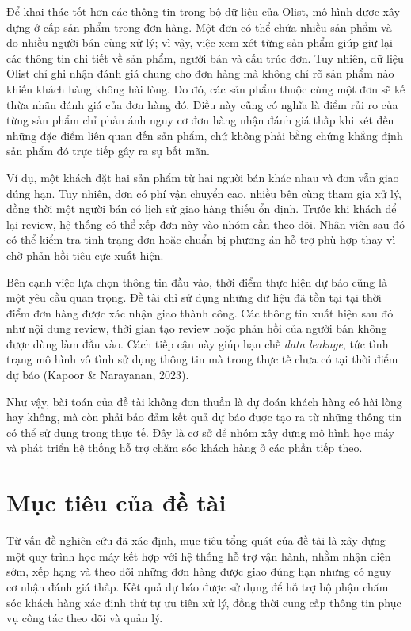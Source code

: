\documentclass[12pt,a4paper]{report}
\begin{document}
Để khai thác tốt hơn các thông tin trong bộ dữ liệu của Olist, mô hình được xây dựng ở cấp sản phẩm trong đơn hàng. Một đơn có thể chứa nhiều sản phẩm và do nhiều người bán cùng xử lý; vì vậy, việc xem xét từng sản phẩm giúp giữ lại các thông tin chi tiết về sản phẩm, người bán và cấu trúc đơn. Tuy nhiên, dữ liệu Olist chỉ ghi nhận đánh giá chung cho đơn hàng mà không chỉ rõ sản phẩm nào khiến khách hàng không hài lòng. Do đó, các sản phẩm thuộc cùng một đơn sẽ kế thừa nhãn đánh giá của đơn hàng đó. Điều này cũng có nghĩa là điểm rủi ro của từng sản phẩm chỉ phản ánh nguy cơ đơn hàng nhận đánh giá thấp khi xét đến những đặc điểm liên quan đến sản phẩm, chứ không phải bằng chứng khẳng định sản phẩm đó trực tiếp gây ra sự bất mãn.

Ví dụ, một khách đặt hai sản phẩm từ hai người bán khác nhau và đơn vẫn giao đúng hạn. Tuy nhiên, đơn có phí vận chuyển cao, nhiều bên cùng tham gia xử lý, đồng thời một người bán có lịch sử giao hàng thiếu ổn định. Trước khi khách để lại review, hệ thống có thể xếp đơn này vào nhóm cần theo dõi. Nhân viên sau đó có thể kiểm tra tình trạng đơn hoặc chuẩn bị phương án hỗ trợ phù hợp thay vì chờ phản hồi tiêu cực xuất hiện.

Bên cạnh việc lựa chọn thông tin đầu vào, thời điểm thực hiện dự báo cũng là một yêu cầu quan trọng. Đề tài chỉ sử dụng những dữ liệu đã tồn tại tại thời điểm đơn hàng được xác nhận giao thành công. Các thông tin xuất hiện sau đó như nội dung review, thời gian tạo review hoặc phản hồi của người bán không được dùng làm đầu vào. Cách tiếp cận này giúp hạn chế \emph{data leakage}, tức tình trạng mô hình vô tình sử dụng thông tin mà trong thực tế chưa có tại thời điểm dự báo (Kapoor \& Narayanan, 2023).

Như vậy, bài toán của đề tài không đơn thuần là dự đoán khách hàng có hài lòng hay không, mà còn phải bảo đảm kết quả dự báo được tạo ra từ những thông tin có thể sử dụng trong thực tế. Đây là cơ sở để nhóm xây dựng mô hình học máy và phát triển hệ thống hỗ trợ chăm sóc khách hàng ở các phần tiếp theo.

\section{Mục tiêu của đề tài}
\label{sec:muc-tieu}

Từ vấn đề nghiên cứu đã xác định, mục tiêu tổng quát của đề tài là xây dựng một quy trình học máy kết hợp với hệ thống hỗ trợ vận hành, nhằm nhận diện sớm, xếp hạng và theo dõi những đơn hàng được giao đúng hạn nhưng có nguy cơ nhận đánh giá thấp. Kết quả dự báo được sử dụng để hỗ trợ bộ phận chăm sóc khách hàng xác định thứ tự ưu tiên xử lý, đồng thời cung cấp thông tin phục vụ công tác theo dõi và quản lý.
\end{document}
